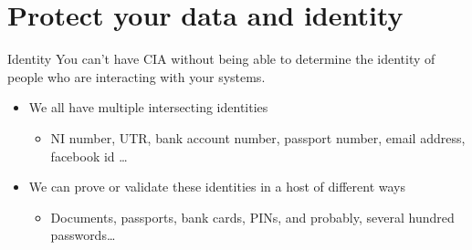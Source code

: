 \documentclass[xcolor=table]{beamer}
\begin{document}
\section{Protect your data and identity}
\begin{frame}{Identity}
	You can't have CIA without being able to determine the identity of people who are interacting with your systems.

	\vspace{0.5em}

	\begin{itemize}
		\item We all have multiple intersecting identities
			\begin{itemize}
				\item NI number, UTR, bank account number, passport number, email address, facebook id \ldots
			\end{itemize}
		\item We can prove or validate these identities in a host of different ways
			\begin{itemize}
				\item Documents, passports, bank cards, PINs, and probably, several hundred passwords\ldots
			\end{itemize}
	\end{itemize}

\end{frame}
\end{document}
